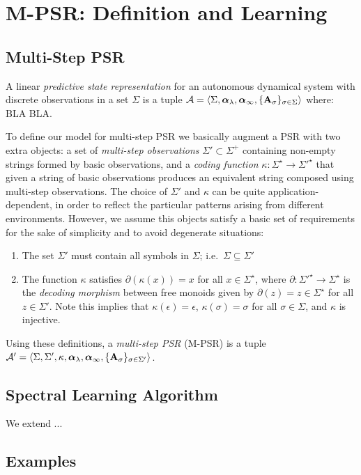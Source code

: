 \section{M-PSR: Definition and Learning}

\subsection{Multi-Step PSR}

A linear \emph{predictive state representation} for an autonomous dynamical system with discrete observations in a set $\Sigma$ is a tuple $\mathcal{A} = \langle \Sigma, \boldsymbol{\alpha}_\lambda, \boldsymbol{\alpha}_{\infty}, \{\mathbf{A}_\sigma\}_{\sigma \in \Sigma} \rangle$ where: BLA BLA.

To define our model for multi-step PSR we basically augment a PSR with two extra objects: a set of \emph{multi-step observations} $\Sigma' \subset \Sigma^+$ containing non-empty strings formed by basic observations, and a \emph{coding function} $\kappa : \Sigma^\star \to {\Sigma'}^{\star}$ that given a string of basic observations produces an equivalent string composed using multi-step observations.
%
The choice of $\Sigma'$ and $\kappa$ can be quite application-dependent, in order to reflect the particular patterns arising from different environments. However, we assume this objects satisfy a basic set of requirements for the sake of simplicity and to avoid degenerate situations:
\begin{enumerate}
\item The set $\Sigma'$ must contain all symbols in $\Sigma$; i.e.\ $\Sigma \subseteq \Sigma'$
\item The function $\kappa$ satisfies $\partial(\kappa(x)) = x$ for all $x \in \Sigma^\star$, where $\partial : {\Sigma'}^\star \to \Sigma^\star$ is the \emph{decoding morphism} between free monoids given by $\partial(z) = z \in \Sigma^\star$ for all $z \in \Sigma'$. Note this implies that $\kappa(\epsilon) = \epsilon$, $\kappa(\sigma) = \sigma$ for all $\sigma \in \Sigma$, and $\kappa$ is injective.
\end{enumerate}

Using these definitions, a \emph{multi-step PSR} (M-PSR) is a tuple $\mathcal{A}' = \langle \Sigma, \Sigma', \kappa, \boldsymbol{\alpha}_\lambda, \boldsymbol{\alpha}_{\infty}, \{\mathbf{A}_\sigma\}_{\sigma \in \Sigma'} \rangle$.

\subsection{Spectral Learning Algorithm}

We extend \cite{bootspsr}...

\subsection{Examples}

